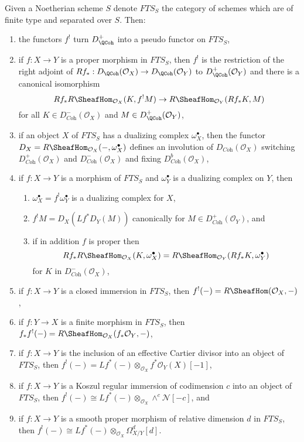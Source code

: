 \medskip\noindent
Given a Noetherian scheme $S$ denote $\textit{FTS}_S$ the category
of schemes which are of finite type and separated over $S$. Then:
\begin{enumerate}
\item the functors $f^!$ turn $D_\QCoh^+$ into a pseudo functor
on $\textit{FTS}_S$,
\item if $f : X \to Y$ is a proper morphism in $\textit{FTS}_S$,
then $f^!$ is the restriction of the right adjoint of
$Rf_* : D_\QCoh(\mathcal{O}_X) \to D_\QCoh(\mathcal{O}_Y)$
to $D_\QCoh^+(\mathcal{O}_Y)$ and there is a canonical isomorphism
$$
Rf_*R\SheafHom_{\mathcal{O}_X}(K, f^!M)
\to
R\SheafHom_{\mathcal{O}_Y}(Rf_*K, M)
$$
for all $K \in D_{\textit{Coh}}^-(\mathcal{O}_X)$ and
$M \in D_\QCoh^+(\mathcal{O}_Y)$,
\item if an object $X$ of $\textit{FTS}_S$ has a dualizing complex
$\omega_X^\bullet$, then the functor
$D_X = R\SheafHom_{\mathcal{O}_X}(-, \omega_X^\bullet)$
defines an involution of $D_{\textit{Coh}}(\mathcal{O}_X)$
switching $D_{\textit{Coh}}^+(\mathcal{O}_X)$ and
$D_{\textit{Coh}}^-(\mathcal{O}_X)$ and fixing
$D_{\textit{Coh}}^b(\mathcal{O}_X)$,
\item if $f : X \to Y$ is a morphism of $\textit{FTS}_S$
and $\omega_Y^\bullet$ is a dualizing complex on $Y$, then
\begin{enumerate}
\item $\omega_X^\bullet = f^!\omega_Y^\bullet$ is a dualizing complex for $X$,
\item $f^!M = D_X(Lf^*D_Y(M))$ canonically for
$M \in D_{\textit{Coh}}^+(\mathcal{O}_Y)$, and
\item if in addition $f$ is proper then
$$
Rf_*R\SheafHom_{\mathcal{O}_X}(K, \omega_X^\bullet) =
R\SheafHom_{\mathcal{O}_Y}(Rf_*K, \omega_Y^\bullet)
$$
for $K$ in $D^-_{\textit{Coh}}(\mathcal{O}_X)$,
\end{enumerate}
\item if $f : X \to Y$ is a closed immersion in $\textit{FTS}_S$,
then $f^!(-) = R\SheafHom(\mathcal{O}_X, -)$,
\item if $f : Y \to X$ is a finite morphism in $\textit{FTS}_S$,
then $f_*f^!(-) = R\SheafHom_{\mathcal{O}_X}(f_*\mathcal{O}_Y, -)$,
\item if $f : X \to Y$ is the inclusion of an effective Cartier divisor
into an object of $\textit{FTS}_S$, then
$f^!(-) = Lf^*(-) \otimes_{\mathcal{O}_X} f^*\mathcal{O}_Y(X)[-1]$,
\item if $f : X \to Y$ is a Koszul regular immersion of codimension $c$
into an object of $\textit{FTS}_S$, then
$f^!(-) \cong Lf^*(-) \otimes_{\mathcal{O}_X} \wedge^c\mathcal{N}[-c]$, and
\item if $f : X \to Y$ is a smooth proper morphism of relative dimension $d$
in $\textit{FTS}_S$, then
$f^!(-) \cong Lf^*(-)  \otimes_{\mathcal{O}_X} \Omega^d_{X/Y}[d]$.
\end{enumerate}
